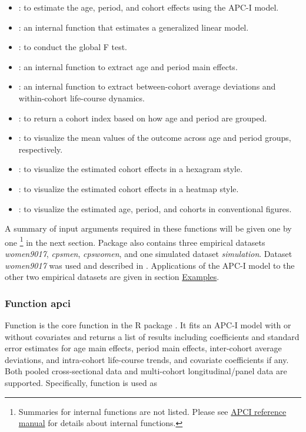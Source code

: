 \begin{itemize}
\item {}: to estimate the age, period, and cohort effects using the APC-I model.
\item{}: an internal function that estimates a generalized linear model.
\item {}: to conduct the global F test.
\item{}: an internal function to extract age and period main effects. 
\item{}: an internal function to extract between-cohort average deviations and within-cohort life-course dynamics.
\item{}: to return a cohort index based on how age and period are grouped. 
\item {}: to visualize the mean values of the outcome across age and period groups, respectively. 
\item {}: to visualize the estimated cohort effects in a hexagram style.
\item {}: to visualize the estimated cohort effects in a heatmap style.
\item {}: to visualize the estimated age, period, and cohorts in conventional figures.
\end{itemize}

A summary of input arguments required in these functions will be given one by one \footnote{Summaries for internal functions are not listed. Please see \href{https://cran.r-project.org/web/packages/APCI/APCI.pdf}{APCI reference manual} for details about internal functions.} in the next section. Package  also contains three empirical datasets \textit{women9017}, \textit{cpsmen}, \textit{cpswomen}, and one simulated dataset \textit{simulation}. Dataset \textit{women9017} was used and described in \citet{luo_age-period-cohort-interaction_2020}. Applications of the APC-I model to the other two empirical datasets are given in section \hyperref[example]{Examples}.

\subsubsection{Function apci} \label{fun:apci}

Function {} is the core function in the R package . It fits an APC-I model with or without covariates and returns a list of results including coefficients and standard error estimates for age main effects, period main effects, inter-cohort average deviations, and intra-cohort life-course trends, and covariate coefficients if any. Both pooled cross-sectional data and multi-cohort longitudinal/panel data are supported. Specifically, function {} is used as 

